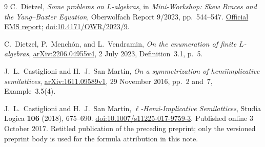 \documentclass[11pt]{article}
\begin{document}
\begin{thebibliography}{9}
C.~Dietzel, \emph{Some problems on \(L\)-algebras}, in
\emph{Mini-Workshop: Skew Braces and the Yang--Baxter Equation},
Oberwolfach Report 9/2023, pp.~544--547.
\href{https://ems.press/content/serial-article-files/47003}{Official EMS report};
\href{https://doi.org/10.4171/OWR/2023/9}{doi:10.4171/OWR/2023/9}.

C.~Dietzel, P.~Mench\'on, and L.~Vendramin,
\emph{On the enumeration of finite \(L\)-algebras},
\href{https://arxiv.org/abs/2206.04955v4}{arXiv:2206.04955v4},
2 July 2023, Definition~3.1, p.~5.

J.~L.~Castiglioni and H.~J.~San Mart\'in,
\emph{On a symmetrization of hemiimplicative semilattices},
\href{https://arxiv.org/abs/1611.09589v1}{arXiv:1611.09589v1},
29 November 2016, pp.~2 and~7, Example~3.5(4).

J.~L.~Castiglioni and H.~J.~San Mart\'in,
\emph{\(\ell\)-Hemi-Implicative Semilattices},
Studia Logica \textbf{106} (2018), 675--690.
\href{https://doi.org/10.1007/s11225-017-9759-3}{doi:10.1007/s11225-017-9759-3}.
Published online 3 October 2017. Retitled publication of the preceding
preprint; only the versioned preprint body is used for the formula
attribution in this note.
\end{thebibliography}
\end{document}
